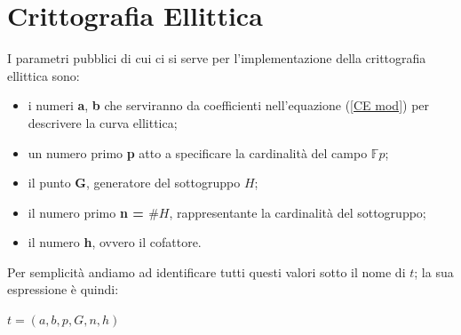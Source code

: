\documentclass[a4paper,12pt]{tesiinfo}
\begin{document}
\section{Crittografia Ellittica}
I parametri pubblici di cui ci si serve per l'implementazione della crittografia ellittica sono:
\begin{itemize}
 \item i numeri \textbf{a}, \textbf{b} che serviranno da coefficienti nell'equazione (\ref{CE mod}) per descrivere la curva ellittica;
 
 \item un numero primo \textbf{p} atto a specificare la cardinalit\`a del campo $\mathbb{F}p$;
 
 \item il punto \textbf{G}, generatore del sottogruppo $H$;
 
 \item il numero primo \textbf{n = $\#H$}, rappresentante la cardinalit\`a del sottogruppo;
 
 \item il numero \textbf{h}, ovvero il cofattore.
\end{itemize}
Per semplicit\`a andiamo ad identificare tutti questi valori sotto il nome di $t$; la sua espressione \`e quindi:
\begin{center}
 $t= (a, b, p, G, n, h)$
\end{center}
\end{document}
